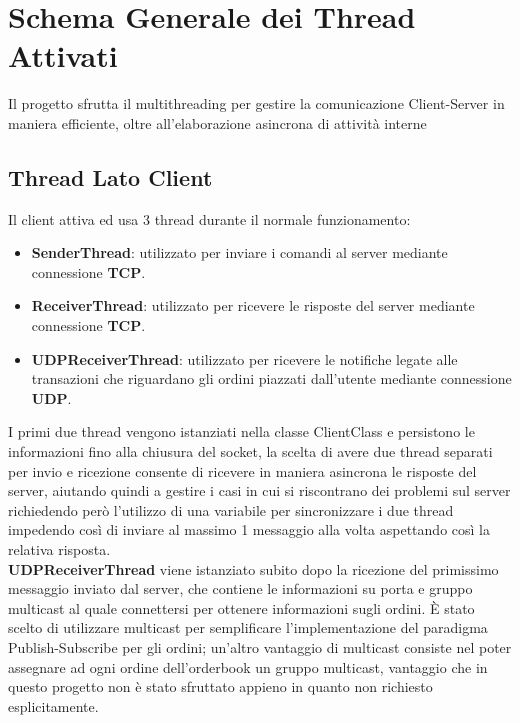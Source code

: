 \documentclass{article}
\begin{document}
\section{Schema Generale dei Thread Attivati}
Il progetto sfrutta il multithreading per gestire la comunicazione Client-Server in maniera efficiente, oltre all'elaborazione asincrona di attività interne
\subsection{Thread Lato Client}
Il client attiva ed usa 3 thread durante il normale funzionamento:
\begin{itemize}
  \item \textbf{SenderThread}: utilizzato per inviare i comandi al server mediante connessione \textbf{TCP}.
  \item \textbf{ReceiverThread}: utilizzato per ricevere le risposte del server mediante connessione \textbf{TCP}.
  \item \textbf{UDPReceiverThread}: utilizzato per ricevere le notifiche legate alle transazioni che riguardano gli ordini piazzati dall'utente mediante connessione \textbf{UDP}.
\end{itemize}
I primi due thread vengono istanziati nella classe ClientClass e persistono le informazioni fino alla chiusura del socket, la scelta di avere due thread separati per invio e ricezione consente di ricevere in maniera asincrona le risposte del server, aiutando quindi a gestire i casi in cui si riscontrano dei problemi sul server richiedendo però l'utilizzo di una variabile per sincronizzare i due thread impedendo così di inviare al massimo 1 messaggio alla volta aspettando così la relativa risposta.
\\ \textbf{UDPReceiverThread} viene istanziato subito dopo la ricezione del primissimo messaggio inviato dal server, che contiene le informazioni su porta e gruppo multicast al quale connettersi per ottenere informazioni sugli ordini.
È stato scelto di utilizzare multicast per semplificare l'implementazione del paradigma Publish-Subscribe per gli ordini; un'altro vantaggio di multicast consiste nel poter assegnare ad ogni ordine dell'orderbook un gruppo multicast, vantaggio che in questo progetto non è stato sfruttato appieno in quanto non richiesto esplicitamente.
\end{document}
